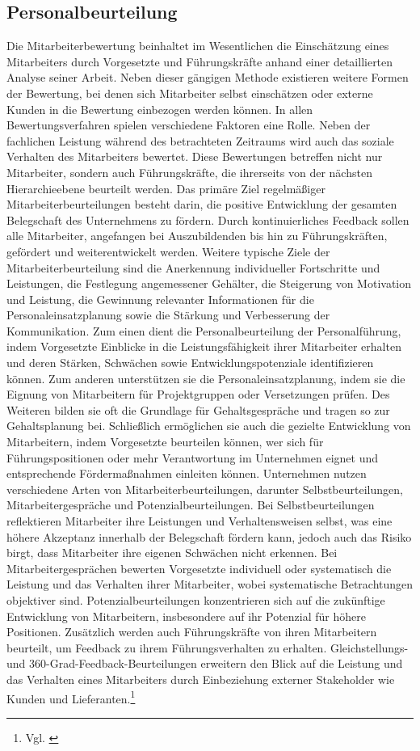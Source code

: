\subsection{Personalbeurteilung}
Die Mitarbeiterbewertung beinhaltet im Wesentlichen die Einschätzung eines Mitarbeiters durch Vorgesetzte und Führungskräfte anhand einer detaillierten Analyse seiner Arbeit. Neben dieser gängigen Methode existieren weitere Formen der Bewertung, bei denen sich Mitarbeiter selbst einschätzen oder externe Kunden in die Bewertung einbezogen werden können. In allen Bewertungsverfahren spielen verschiedene Faktoren eine Rolle. Neben der fachlichen Leistung während des betrachteten Zeitraums wird auch das soziale Verhalten des Mitarbeiters bewertet. Diese Bewertungen betreffen nicht nur Mitarbeiter, sondern auch Führungskräfte, die ihrerseits von der nächsten Hierarchieebene beurteilt werden. Das primäre Ziel regelmäßiger Mitarbeiterbeurteilungen besteht darin, die positive Entwicklung der gesamten Belegschaft des Unternehmens zu fördern. Durch kontinuierliches Feedback sollen alle Mitarbeiter, angefangen bei Auszubildenden bis hin zu Führungskräften, gefördert und weiterentwickelt werden. Weitere typische Ziele der Mitarbeiterbeurteilung sind die Anerkennung individueller Fortschritte und Leistungen, die Festlegung angemessener Gehälter, die Steigerung von Motivation und Leistung, die Gewinnung relevanter Informationen für die Personaleinsatzplanung sowie die Stärkung und Verbesserung der Kommunikation.  Zum einen dient die Personalbeurteilung der Personalführung, indem Vorgesetzte Einblicke in die Leistungsfähigkeit ihrer Mitarbeiter erhalten und deren Stärken, Schwächen sowie Entwicklungspotenziale identifizieren können. Zum anderen unterstützen sie die Personaleinsatzplanung, indem sie die Eignung von Mitarbeitern für Projektgruppen oder Versetzungen prüfen. Des Weiteren bilden sie oft die Grundlage für Gehaltsgespräche und tragen so zur Gehaltsplanung bei. Schließlich ermöglichen sie auch die gezielte Entwicklung von Mitarbeitern, indem Vorgesetzte beurteilen können, wer sich für Führungspositionen oder mehr Verantwortung im Unternehmen eignet und entsprechende Fördermaßnahmen einleiten können. Unternehmen nutzen verschiedene Arten von Mitarbeiterbeurteilungen, darunter Selbstbeurteilungen, Mitarbeitergespräche und Potenzialbeurteilungen. Bei Selbstbeurteilungen reflektieren Mitarbeiter ihre Leistungen und Verhaltensweisen selbst, was eine höhere Akzeptanz innerhalb der Belegschaft fördern kann, jedoch auch das Risiko birgt, dass Mitarbeiter ihre eigenen Schwächen nicht erkennen. Bei Mitarbeitergesprächen bewerten Vorgesetzte individuell oder systematisch die Leistung und das Verhalten ihrer Mitarbeiter, wobei systematische Betrachtungen objektiver sind. Potenzialbeurteilungen konzentrieren sich auf die zukünftige Entwicklung von Mitarbeitern, insbesondere auf ihr Potenzial für höhere Positionen. Zusätzlich werden auch Führungskräfte von ihren Mitarbeitern beurteilt, um Feedback zu ihrem Führungsverhalten zu erhalten. Gleichstellungs- und 360-Grad-Feedback-Beurteilungen erweitern den Blick auf die Leistung und das Verhalten eines Mitarbeiters durch Einbeziehung externer Stakeholder wie Kunden und Lieferanten.\footnote{Vgl. \cite{Striegel2023}}

